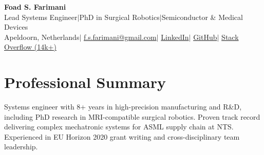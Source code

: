 \documentclass[10pt,a4paper]{article}
\begin{document}
\begin{center}
 {\LARGE\bfseries Foad S. Farimani} \\[3pt]
 {\small Lead Systems Engineer\enspace$\mid$\enspace PhD in Surgical Robotics\enspace$\mid$\enspace Semiconductor \& Medical Devices}
 \\[3pt]
 {\footnotesize
  Apeldoorn, Netherlands\enspace$\mid$\enspace
  \href{mailto:f.s.farimani@gmail.com}{f.s.farimani@gmail.com}\enspace$\mid$\enspace
  \href{https://linkedin.com/in/fsfarimani}{LinkedIn}\enspace$\mid$\enspace
  \href{https://github.com/Foadsf}{GitHub}\enspace$\mid$\enspace
  \href{https://stackoverflow.com/users/4999991}{Stack Overflow (14k+)}
 }
\end{center}

\section{Professional Summary}
Systems engineer with 8+ years in high-precision manufacturing and R\&D, including
PhD research in MRI-compatible surgical robotics. Proven track record delivering
complex mechatronic systems for ASML supply chain at NTS. Experienced in
EU Horizon 2020 grant writing and cross-disciplinary team leadership.


\end{document}
